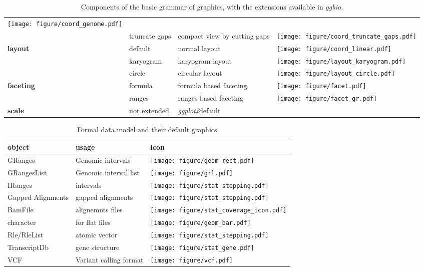 \documentclass[a4paper, 11pt]{article}
\newcommand{\Rpackage}[1]{{\textit{#1}}}
\newcommand{\ggbio}{\Rpackage{ggbio}}
\newcommand{\ggplot}{\Rpackage{ggplot2}}
\begin{document}
\begin{table}[h!t!b!p]
{\begin{tabular}{|p{1cm}|p{2cm}|p{4cm}|p{1cm}|}
               \texttt{[image: figure/coord\_genome.pdf]}\\
               &truncate gaps & compact view by cutting gaps&
               \texttt{[image: figure/coord\_truncate\_gaps.pdf]}\\\hline
\textbf{layout}&default & normal layout &\texttt{[image: figure/coord\_linear.pdf]}\\
              &karyogram & karyogram layout &
              \texttt{[image: figure/layout\_karyogram.pdf]}\\
              &circle & circular layout&
              \texttt{[image: figure/layout\_circle.pdf]}\\\hline
\textbf{faceting}&formula & formula based faceting&
               \texttt{[image: figure/facet.pdf]}\\
                 &ranges & ranges based faceting &
                 \texttt{[image: figure/facet\_gr.pdf]}\\\hline
\textbf{scale} &not extended  & \ggplot{}default& \\\hline
\end{tabular}
}
\caption{Components of the basic grammar of graphics, with the extensions available in 
\ggbio{}.}
\label{tab:components}
\end{table}


\begin{table}[h!t!b!p]
\small{
\begin{tabular}{|p{4cm}|p{3cm}|p{2cm}|}
\hline
object & usage & icon\\\hline
GRanges & Genomic intervals&\texttt{[image: figure/geom\_rect.pdf]}\\\hline
GRangesList &Genomic interval list&\texttt{[image: figure/grl.pdf]}\\\hline
IRanges&intervals&\texttt{[image: figure/stat\_stepping.pdf]}\\\hline
Gapped Alignments & gapped alignments&
 \texttt{[image: figure/stat\_stepping.pdf]}\\\hline
BamFile&alignemnts files&\texttt{[image: figure/stat\_coverage\_icon.pdf]}\\\hline
character&for flat files&\texttt{[image: figure/geom\_bar.pdf]}\\\hline
Rle/RleList&atomic vector&\texttt{[image: figure/stat\_stepping.pdf]}\\\hline
TranscriptDb&gene structure &\texttt{[image: figure/stat\_gene.pdf]}\\\hline
VCF&Variant calling format&\texttt{[image: figure/vcf.pdf]}\\\hline
\end{tabular}
}
\caption{Formal data model and their default graphics}
\label{tab:model}
\end{table}
\end{document}

